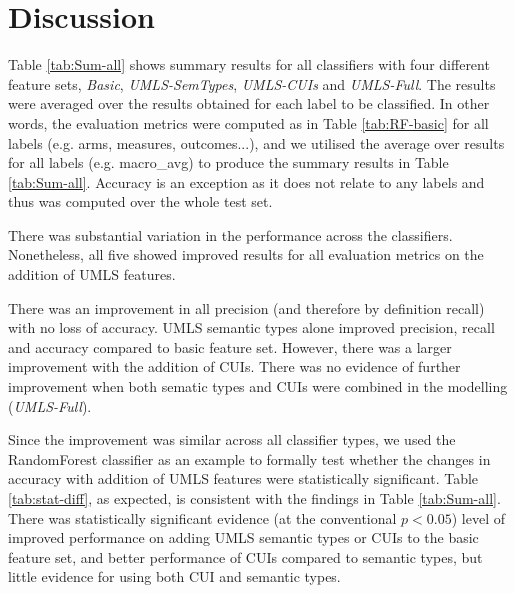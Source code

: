 \documentclass[10.7pt,]{article}
\begin{document}

\section{Discussion}\label{results}
Table \ref{tab:Sum-all} shows summary results for all classifiers with four different feature sets, \textit{Basic}, \textit{UMLS-SemTypes}, \textit{UMLS-CUIs} and \textit{UMLS-Full}. The results were averaged over the results obtained for each label to be classified. In other words, the evaluation metrics were computed as in Table \ref{tab:RF-basic} for all labels (e.g. arms, measures, outcomes...), and we utilised the average over results for all labels (e.g. macro\_avg) to produce the summary results in Table \ref{tab:Sum-all}. Accuracy is an exception as it does not relate to any labels and thus was computed over the whole test set.



There was substantial variation in the performance across the classifiers. Nonetheless, all five showed improved results for all evaluation metrics on the addition of UMLS features.

There was an improvement in all precision (and therefore by definition recall) with no loss of accuracy. UMLS semantic types \cite{semtypes} alone improved precision, recall and accuracy compared to basic feature set. However, there was a larger improvement with the addition of CUIs. %
There was no evidence of further improvement when both sematic types and CUIs were combined in the modelling (\textit{UMLS-Full}).

Since the improvement was similar across all classifier types, we used the RandomForest classifier as an example to formally test whether the changes in accuracy with addition of UMLS features were statistically significant. Table \ref{tab:stat-diff}, as expected, is consistent with the findings in Table \ref{tab:Sum-all}. There was statistically significant evidence (at the conventional $ p < 0.05 $) level of improved performance on adding UMLS semantic types or CUIs to the basic feature set, and better performance of CUIs compared to semantic types, but little evidence for using both CUI and semantic types. 
%
\end{document}
